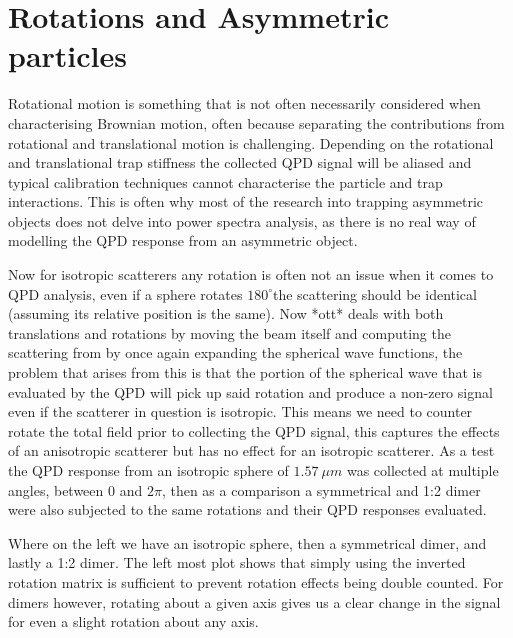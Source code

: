 \section{Rotations and Asymmetric particles}
Rotational motion is something that is not often necessarily considered when characterising Brownian motion, often because separating the contributions from rotational and translational motion is challenging. Depending on the rotational and translational trap stiffness the collected QPD signal will be aliased and typical calibration techniques cannot characterise the particle and trap interactions. This is often why most of the research into trapping asymmetric objects does not delve into power spectra analysis, as there is no real way of modelling the QPD response from an asymmetric object. 

Now for isotropic scatterers any rotation is often not an issue when it comes to QPD analysis, even if a sphere rotates $180^{\circ}$the scattering should be identical (assuming its relative position is the same). Now *ott* deals with both translations and rotations by moving the beam itself and computing the scattering from by once again expanding the spherical wave functions, the problem that arises from this is that the portion of the spherical wave that is evaluated by the QPD will pick up said rotation and produce a non-zero signal even if the scatterer in question is isotropic. This means we need to counter rotate the total field prior to collecting the QPD signal, this captures the effects of an anisotropic scatterer but has no effect for an isotropic scatterer. As a test the QPD response from an isotropic sphere of $1.57 \ \mu m$ was collected at multiple angles, between 0 and $2\pi$, then as a comparison a symmetrical and 1:2 dimer were also subjected to the same rotations and their QPD responses evaluated. 

Where on the left we have an isotropic sphere, then a symmetrical dimer, and lastly a 1:2 dimer. The left most plot shows that simply using the inverted rotation matrix is sufficient to prevent rotation effects being double counted.
For dimers however, rotating about a given axis gives us a clear change in the signal for even a slight rotation about any axis. 

